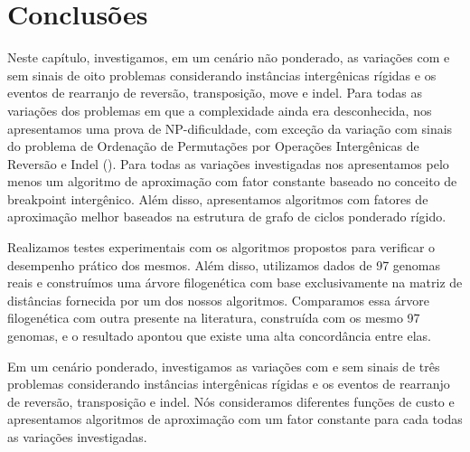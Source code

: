 \section{Conclusões}

Neste capítulo, investigamos, em um cenário não ponderado, as variações com e sem sinais de oito problemas considerando instâncias intergênicas rígidas e os eventos de rearranjo de reversão, transposição, move e indel. Para todas as variações dos problemas em que a complexidade ainda era desconhecida, nos apresentamos uma prova de NP-dificuldade, com exceção da variação com sinais do problema de Ordenação de Permutações por Operações Intergênicas de Reversão e Indel (\SbIRI). Para todas as variações investigadas nos apresentamos pelo menos um algoritmo de aproximação com fator constante baseado no conceito de breakpoint intergênico. Além disso, apresentamos algoritmos com fatores de aproximação melhor baseados na estrutura de grafo de ciclos ponderado rígido.

Realizamos testes experimentais com os algoritmos propostos para verificar o desempenho prático dos mesmos. Além disso, utilizamos dados de 97 genomas reais e construímos uma árvore filogenética com base exclusivamente na matriz de distâncias fornecida por um dos nossos algoritmos. Comparamos essa árvore filogenética com outra presente na literatura, construída com os mesmo 97 genomas, e o resultado apontou que existe uma alta concordância entre elas.

Em um cenário ponderado, investigamos as variações com e sem sinais de três problemas considerando instâncias intergênicas rígidas e os eventos de rearranjo de reversão, transposição e indel. Nós consideramos diferentes funções de custo e apresentamos algoritmos de aproximação com um fator constante para cada todas as variações investigadas.